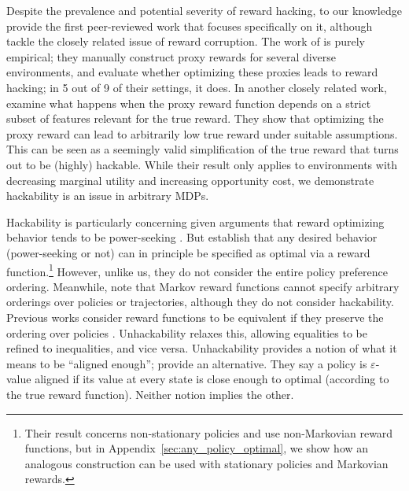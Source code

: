\documentclass{article}
\theoremstyle{definition}
\theoremstyle{remark}
\begin{document}
Despite the prevalence and potential severity of reward hacking, to our knowledge \citet{pan2022effects} provide the first peer-reviewed work that focuses specifically on it, although \citet{everitt2017reinforcement} tackle the closely related issue of reward corruption. %
The work of \citet{pan2022effects} is purely empirical; they manually construct proxy rewards for several diverse environments, and evaluate whether optimizing these proxies leads to reward hacking; in 5 out of 9 of their settings, it does.
In another closely related work, \citet{zhuang2020consequences} examine what happens when the proxy reward function depends on a strict subset of features relevant for the true reward. 
They show that optimizing the proxy reward can lead to arbitrarily low true reward under suitable assumptions. This can be seen as a seemingly valid simplification of the true reward that turns out to be (highly) hackable. 
While their result only applies to environments with decreasing marginal utility and increasing opportunity cost, we demonstrate hackability is an issue in arbitrary MDPs.

\newpage

Hackability is particularly concerning given arguments that reward optimizing behavior tends to be power-seeking \citep{turner2021optimalneurips}. %
But \citet{leike2018scalable} establish that any desired behavior (power-seeking or not) can in principle be specified as optimal via a reward function.\footnote{
Their result concerns non-stationary policies and use non-Markovian reward functions, but in Appendix~\ref{sec:any_policy_optimal}, we show how an analogous construction can be used with stationary policies and Markovian rewards.}
However, unlike us, they do not consider the entire policy preference ordering. %
Meanwhile, \citet{abel2021expressivity} note that Markov reward functions cannot specify arbitrary orderings over policies or trajectories, although they do not consider hackability.
Previous works consider reward functions to be equivalent if they preserve the ordering over policies \citep{ng1999policy, ng2000algorithms}.  Unhackability relaxes this, allowing equalities to be refined to inequalities, and vice versa.
Unhackability provides a notion of what it means to be  ``aligned enough''; \citet{brown2020value} provide an alternative.
They say a policy is $\varepsilon$-value aligned if its value at every state is close enough to optimal (according to the true reward function).
Neither notion implies the other. 
\end{document}
